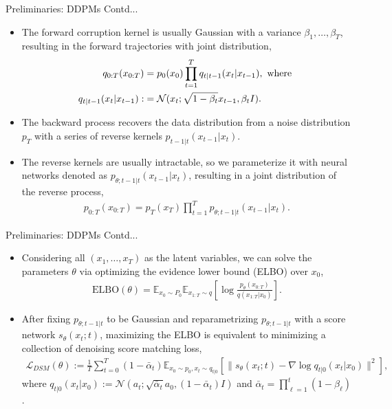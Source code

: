 \documentclass[aspectratio=169,xcolor=dvipsnames]{beamer}
\newcommand{\bE}{\mathbb{E}}
\newcommand{\cL}{\mathcal{L}}
\newcommand{\te}{\theta}
\newcommand{\nal}[1]{\begin{align*}#1\end{align*}}
\newcommand{\al}[1]{\begin{align}#1\end{align}}
\newcommand{\cN}{\mathcal{N}}
\begin{document}
\begin{frame}{Preliminaries: DDPMs Contd...}
\begin{itemize}
 \item The forward corruption kernel is usually Gaussian with a variance $\beta_1,\ldots,\beta_T$, resulting in the forward trajectories with joint distribution,
 \al{
    q_{0:T}(x_{0:T})&=p_0(x_0)\prod\limits_{t=1}^{T}q_{t|t-1}(x_t|x_{t-1}), \text{ where }\notag\\
    q_{t|t-1}(x_t|x_{t-1}):&= \cN(x_t;\sqrt{1-\beta_t}x_{t-1},\beta_t I). \label{eq:3}
 }
 \item  The backward process recovers the data distribution from a noise distribution $p_T$ with a series of reverse kernels $p_{t-1|t}(x_{t-1}|x_t)$.
 \item  The reverse kernels are usually intractable, so we parameterize it with neural networks denoted as $p_{\te;t-1|t}(x_{t-1}|x_t)$,
 resulting in a joint distribution of the reverse process,
 \al{
    p_{0:T}(x_{0:T})=p_T(x_T)\prod\limits_{t=1}^{T}  p_{\te;t-1|t}(x_{t-1}|x_t). \label{eq:4}
 }
 \end{itemize}
\end{frame}

\begin{frame}{Preliminaries: DDPMs Contd...}
\begin{itemize}
 \item Considering all $(x_1,\ldots,x_T)$ as the latent variables, we can solve the parameters $\te$ via optimizing the evidence lower bound (ELBO) over $x_0$,
 \nal{
    \text{ELBO}(\te)=\bE_{x_0\sim P_0}\bE_{x_{1:T}\sim q}\left[\log\frac{p_{\te}(x_{0:T})}{q(x_{1:T}|x_0)}\right].
 }
 \item  After fixing $p_{\te;t-1|t}$ to be Gaussian and reparametrizing $p_{\te;t-1|t}$ with a score network $s_{\te}(x_t;t)$, maximizing the ELBO is equivalent to minimizing a collection of denoising score matching loss, 
 \al{
    \cL_{DSM}(\te):=\frac{1}{T}\sum\limits_{t=0}^{T}(1-\bar{\alpha}_t)\bE_{x_0\sim p_0, x_t\sim q_{t|0}}\left[\|s_{\te}(x_t;t)-\nabla\log q_{t|0}(x_t|x_0)\|^2\right], \label{eq:5}
 }
 where $q_{t|0}(x_t|x_0):=\cN(a_t;\sqrt{\bar{\alpha}_t}a_0,(1-\bar{\alpha}_t)I)$ and $\bar{\alpha}_t=\prod\limits_{\ell=1}^t (1-\beta_{\ell})$.
 \end{itemize}
\end{frame}
\end{document}
